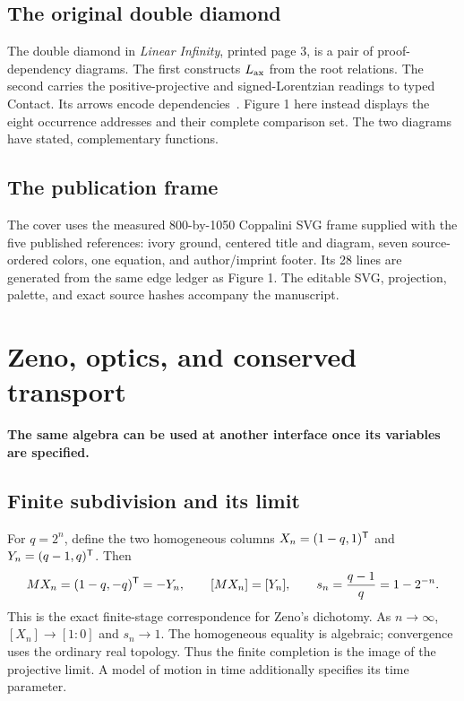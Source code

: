 \documentclass[11pt]{article}
\theoremstyle{definition}\newtheorem{definition}[theorem]{Definition}
\newcommand{\lead}[1]{\textbf{#1}\par}
\newcommand{\page}{\clearpage}
\begin{document}
\subsection{The original double diamond}
The double diamond in \emph{Linear Infinity}, printed page 3, is a pair of proof-dependency diagrams. The first constructs $L_{\mathrm{ax}}$ from the root relations. The second carries the positive-projective and signed-Lorentzian readings to typed Contact. Its arrows encode dependencies~\cite{LI}. Figure 1 here instead displays the eight occurrence addresses and their complete comparison set. The two diagrams have stated, complementary functions.

\subsection{The publication frame}
The cover uses the measured 800-by-1050 Coppalini SVG frame supplied with the five published references: ivory ground, centered title and diagram, seven source-ordered colors, one equation, and author/imprint footer. Its 28 lines are generated from the same edge ledger as Figure 1. The editable SVG, projection, palette, and exact source hashes accompany the manuscript.

\page
\section{Zeno, optics, and conserved transport}
\lead{The same algebra can be used at another interface once its variables are specified.}
\subsection{Finite subdivision and its limit}
For $q=2^n$, define the two homogeneous columns $X_n=(1-q,1)^\mathsf T$ and $Y_n=(q-1,q)^\mathsf T$. Then
\begin{equation}
 MX_n=(1-q,-q)^\mathsf T=-Y_n,\qquad
 [MX_n]=[Y_n],\qquad s_n=\frac{q-1}{q}=1-2^{-n}.
\end{equation}
This is the exact finite-stage correspondence for Zeno's dichotomy. As $n\to\infty$, $[X_n]\to[1:0]$ and $s_n\to1$. The homogeneous equality is algebraic; convergence uses the ordinary real topology. Thus the finite completion is the image of the projective limit. A model of motion in time additionally specifies its time parameter.
\end{document}
